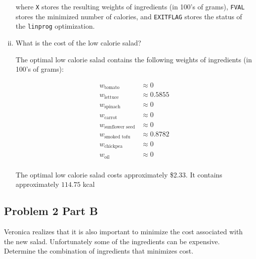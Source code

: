 \documentclass[../main.tex]{subfiles}
\begin{document}
\begin{enumerate}[i.]
	

	where \verb|X| stores the resulting weights of ingredients (in 100's of grams), \verb|FVAL| stores the minimized number of calories, and \verb|EXITFLAG| stores the status of the \verb|linprog| optimization.

	\item What is the cost of the low calorie salad?

	The optimal low calorie salad contains the following weights of ingredients (in 100's of grams):

	\begin{equation*}
		\begin{aligned}
			w_{\text{tomato}} &\approx 0 \\
			w_{\text{lettuce}} &\approx 0.5855 \\
			w_{\text{spinach}} &\approx 0 \\
			w_{\text{carrot}} &\approx 0 \\
			w_{\text{sunflower seed}} &\approx 0 \\
			w_{\text{smoked tofu}} &\approx 0.8782 \\
			w_{\text{chickpea}} &\approx 0 \\
			w_{\text{oil}} &\approx 0 \\
		\end{aligned}
	\end{equation*}

	The optimal low calorie salad costs approximately \$2.33. It contains approximately $114.75$ kcal
\end{enumerate}
\newpage

\subsection*{Problem 2 Part B}
Veronica realizes that it is also important to minimize the cost associated with the new salad. Unfortunately some of the ingredients can be expensive. Determine the combination of ingredients that minimizes cost.
\end{document}
